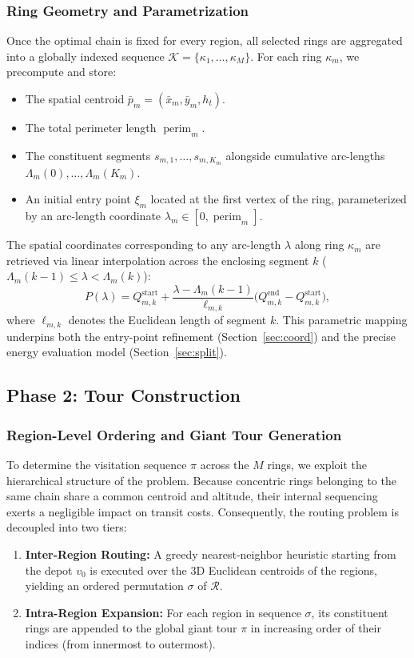 \documentclass[12pt]{elsarticle}
\begin{document}
\subsubsection{Ring Geometry and Parametrization}\label{sec:ring-info}

Once the optimal chain is fixed for every region, all selected rings are aggregated into a globally indexed sequence $\mathcal{K} = \{\kappa_1, \dots, \kappa_M\}$. For each ring $\kappa_m$, we precompute and store:
\begin{itemize}
	\item The spatial centroid $\bar p_m = (\bar x_m, \bar y_m, h_t)$.
	\item The total perimeter length $\operatorname{perim}_m$.
	\item The constituent segments $s_{m,1}, \dots, s_{m,K_m}$ alongside cumulative arc-lengths $\Lambda_m(0), \dots, \Lambda_m(K_m)$.
	\item An initial entry point $\xi_m$ located at the first vertex of the ring, parameterized by an arc-length coordinate $\lambda_m \in [0, \operatorname{perim}_m]$.
\end{itemize}
The spatial coordinates corresponding to any arc-length $\lambda$ along ring $\kappa_m$ are retrieved via linear interpolation across the enclosing segment $k$ ($\Lambda_m(k-1) \le \lambda < \Lambda_m(k)$):
\[
P(\lambda) = Q_{m,k}^{\text{start}} + \frac{\lambda - \Lambda_m(k-1)}{\ell_{m,k}} \bigl( Q_{m,k}^{\text{end}} - Q_{m,k}^{\text{start}} \bigr),
\]
where $\ell_{m,k}$ denotes the Euclidean length of segment $k$. This parametric mapping underpins both the entry-point refinement (Section~\ref{sec:coord}) and the precise energy evaluation model (Section~\ref{sec:split}).

\subsection{Phase 2: Tour Construction}

\subsubsection{Region-Level Ordering and Giant Tour Generation}\label{sec:tsp}

To determine the visitation sequence $\pi$ across the $M$ rings, we exploit the hierarchical structure of the problem. Because concentric rings belonging to the same chain share a common centroid and altitude, their internal sequencing exerts a negligible impact on transit costs. Consequently, the routing problem is decoupled into two tiers:
\begin{enumerate}
	\item \textbf{Inter-Region Routing:} A greedy nearest-neighbor heuristic starting from the depot $v_0$ is executed over the 3D Euclidean centroids of the regions, yielding an ordered permutation $\sigma$ of $\mathcal{R}$.
	\item \textbf{Intra-Region Expansion:} For each region in sequence $\sigma$, its constituent rings are appended to the global giant tour $\pi$ in increasing order of their indices (from innermost to outermost).
\end{enumerate}
\end{document}
